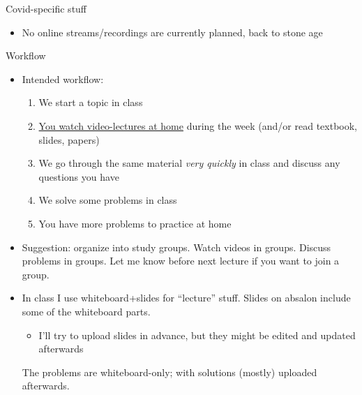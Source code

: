 \documentclass[english,10pt
,aspectratio=169
]{beamer}
\begin{document}
\begin{frame}{Covid-specific stuff}
	\begin{itemize}
		\item No online streams/recordings are currently planned, back to stone age
	\end{itemize}
\end{frame}


\begin{frame}{Workflow}
	\begin{itemize}
		\item Intended workflow: 
		\begin{enumerate}
			\item We start a topic in class
			\item \uline{You watch video-lectures at home} during the week (and/or read textbook, slides, papers)
			\item We go through the same material \emph{very quickly} in class and discuss any questions you have
			\item We solve some problems in class
			\item You have more problems to practice at home
		\end{enumerate}
		\pause
		\item Suggestion: organize into study groups. Watch videos in groups. Discuss problems in groups. Let me know before next lecture if you want to join a group.
		\pause
		\item In class I use whiteboard+slides for ``lecture'' stuff. Slides on absalon include some of the whiteboard parts.
		\begin{itemize}
			\item I'll try to upload slides in advance, but they might be edited and updated afterwards
		\end{itemize}
		The problems are whiteboard-only; with solutions (mostly) uploaded afterwards.
	\end{itemize}
\end{frame}
\end{document}

